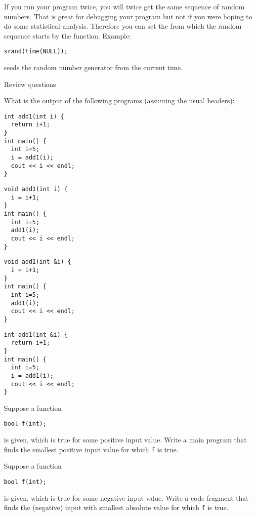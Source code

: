 If you run your program twice, you will twice get the same sequence of
random numbers. That is great for debugging your program but not if
you were hoping to do some statistical analysis. Therefore you can set
the  from which the random sequence
starts by the  function. Example:
\begin{lstlisting}
srand(time(NULL));
\end{lstlisting}
seeds the random number generator from the current time.

 {Review questions}

\begin{exercise}
  What is the output of the following programs (assuming the usual headers):

  \begin{multicols}{2}
\begin{lstlisting}
int add1(int i) {
  return i+1;
}
int main() {
  int i=5;
  i = add1(i);
  cout << i << endl;
}
\end{lstlisting}
\columnbreak
\begin{lstlisting}
void add1(int i) {
  i = i+1;
}
int main() {
  int i=5;
  add1(i);
  cout << i << endl;
}
\end{lstlisting}
  \end{multicols}

  \begin{multicols}{2}
\begin{lstlisting}
void add1(int &i) {
  i = i+1;
}
int main() {
  int i=5;
  add1(i);
  cout << i << endl;
}
\end{lstlisting}
\columnbreak
\begin{lstlisting}
int add1(int &i) {
  return i+1;
}
int main() {
  int i=5;
  i = add1(i);
  cout << i << endl;
}
\end{lstlisting}
  \end{multicols}
\end{exercise}

\begin{exercise}
  \label{ex:cpp-funcloop1}
  Suppose a function
\begin{lstlisting}
bool f(int);
\end{lstlisting}
is given, which is true for some positive input value. Write a main program that
finds the smallest positive input value for which \lstinline{f} is true.
\end{exercise}

\begin{exercise}
  \label{ex:cpp-funcloop2}
  Suppose a function
\begin{lstlisting}
bool f(int);
\end{lstlisting}
is given, which is true for some negative input value. Write a code fragment that
finds the (negative) input with smallest absolute value for which \lstinline{f} is true.
\end{exercise}

